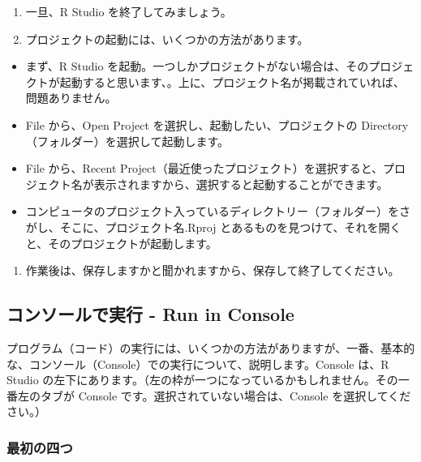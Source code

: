 \documentclass[
]{bxjsbook}
\providecommand{\tightlist}{%
  \setlength{\itemsep}{0pt}\setlength{\parskip}{0pt}}
\theoremstyle{definition}
\theoremstyle{definition}
\theoremstyle{definition}
\theoremstyle{definition}
\theoremstyle{remark}
\begin{document}
\begin{enumerate}
\def\labelenumi{\arabic{enumi}.}
\setcounter{enumi}{2}
\item
  一旦、R Studio を終了してみましょう。
\item
  プロジェクトの起動には、いくつかの方法があります。
\end{enumerate}

\begin{itemize}
\tightlist
\item
  まず、R Studio を起動。一つしかプロジェクトがない場合は、そのプロジェクトが起動すると思います、。上に、プロジェクト名が掲載されていれば、問題ありません。
\item
  File から、Open Project を選択し、起動したい、プロジェクトの Directory（フォルダー）を選択して起動します。
\item
  File から、Recent Project（最近使ったプロジェクト）を選択すると、プロジェクト名が表示されますから、選択すると起動することができます。
\item
  コンピュータのプロジェクト入っているディレクトリー（フォルダー）をさがし、そこに、プロジェクト名.Rproj とあるものを見つけて、それを開くと、そのプロジェクトが起動します。
\end{itemize}

\begin{enumerate}
\def\labelenumi{\arabic{enumi}.}
\setcounter{enumi}{4}
\tightlist
\item
  作業後は、保存しますかと聞かれますから、保存して終了してください。
\end{enumerate}

\hypertarget{ux30b3ux30f3ux30bdux30fcux30ebux3067ux5b9fux884c---run-in-console}{%
\subsection{コンソールで実行 - Run in Console}\label{ux30b3ux30f3ux30bdux30fcux30ebux3067ux5b9fux884c---run-in-console}}

プログラム（コード）の実行には、いくつかの方法がありますが、一番、基本的な、コンソール（Console）での実行について、説明します。Console は、R Studio の左下にあります。（左の枠が一つになっているかもしれません。その一番左のタブが Console です。選択されていない場合は、Console を選択してください。）

\hypertarget{ux6700ux521dux306eux56dbux3064}{%
\subsubsection{最初の四つ}\label{ux6700ux521dux306eux56dbux3064}}
\end{document}
